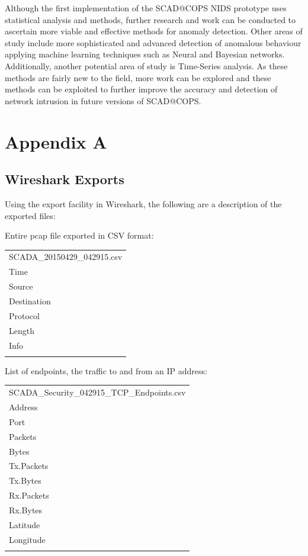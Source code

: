 \documentclass[12pt,]{article}
\begin{document}
Although the first implementation of the SCAD@COPS NIDS prototype uses
statistical analysis and methods, further research and work can be
conducted to ascertain more viable and effective methods for anomaly
detection. Other areas of study include more sophisticated and advanced
detection of anomalous behaviour applying machine learning techniques
such as Neural and Bayesian networks. Additionally, another potential
area of study is Time-Series analysis. As these methods are fairly new
to the field, more work can be explored and these methods can be
exploited to further improve the accuracy and detection of network
intrusion in future versions of SCAD@COPS.

\pagebreak

\section*{Appendix A}\label{appendix-a}

\subsection*{Wireshark Exports}\label{wireshark-exports}

Using the export facility in Wireshark, the following are a description
of the exported files:

Entire pcap file exported in CSV format:

\begin{longtable}[c]{@{}l@{}}
\toprule\addlinespace
SCADA\_20150429\_042915.csv
\\\addlinespace
\midrule\endhead
Time
\\\addlinespace
Source
\\\addlinespace
Destination
\\\addlinespace
Protocol
\\\addlinespace
Length
\\\addlinespace
Info
\\\addlinespace
\bottomrule
\end{longtable}

List of endpoints, the traffic to and from an IP address:

\begin{longtable}[c]{@{}l@{}}
\toprule\addlinespace
SCADA\_Security\_042915\_TCP\_Endpoints.csv
\\\addlinespace
\midrule\endhead
Address
\\\addlinespace
Port
\\\addlinespace
Packets
\\\addlinespace
Bytes
\\\addlinespace
Tx.Packets
\\\addlinespace
Tx.Bytes
\\\addlinespace
Rx.Packets
\\\addlinespace
Rx.Bytes
\\\addlinespace
Latitude
\\\addlinespace
Longitude
\\\addlinespace
\bottomrule
\end{longtable}
\end{document}

